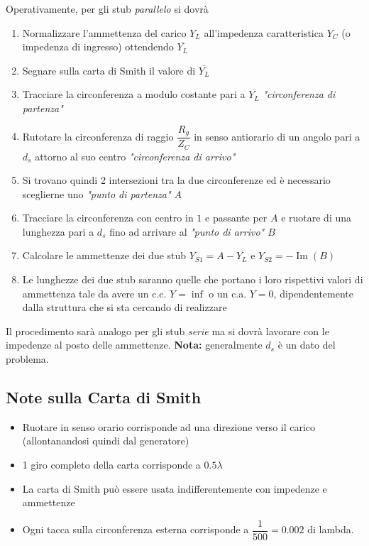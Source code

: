 \documentclass{article}
\begin{document}
Operativamente, per gli stub \textit{parallelo} si dovrà
\begin{enumerate}
	\item Normalizzare l'ammettenza del carico \(Y_L\) all'impedenza caratteristica \(Y_C\) (o impedenza di ingresso) ottendendo \(\overline{Y_L}\)
	\item Segnare sulla carta di Smith il valore di \(\overline{Y_L}\)
	\item Tracciare la circonferenza a modulo costante pari a \(\overline{Y_L}\) \textit{"circonferenza di partenza"}
	\item Rutotare la circonferenza di raggio \(\dfrac{R_g}{Z_C}\) in senso antiorario di un angolo pari a \(d_s\) attorno al suo centro \textit{"circonferenza di arrivo"}
	\item Si trovano quindi 2 intersezioni tra la due circonferenze ed è necessario sceglierne uno \textit{"punto di partenza" \(A\)}
	\item Tracciare la circonferenza con centro in \(1\) e passante per \(A\) e ruotare di una lunghezza pari a \(d_s\) fino ad arrivare al \textit{"punto di arrivo" \(B\)}
	\item Calcolare le ammettenze dei due stub \(Y_{S1} = A - \overline{Y_L}\) e \(Y_{S2} = -\operatorname{Im}(B) \)
	\item Le lunghezze dei due stub saranno quelle che portano i loro rispettivi valori di ammettenza tale da avere un c.c. \( Y = \inf \) o un c.a. \( Y = 0 \), dipendentemente dalla struttura che si sta cercando di realizzare
\end{enumerate}
Il procedimento sarà analogo per gli stub \textit{serie} ma si dovrà lavorare con le impedenze al posto delle ammettenze.
\textbf{Nota:} generalmente \(d_s\) è un dato del problema.

\subsection{Note sulla Carta di Smith}
\begin{itemize}
	\item Ruotare in senso orario corrisponde ad una direzione verso il carico (allontanandosi quindi dal generatore)
	\item 1 giro completo della carta corrisponde a \(0.5 \lambda\)
	\item La carta di Smith può essere usata indifferentemente con impedenze e ammettenze
	\item Ogni tacca sulla circonferenza esterna corrisponde a \( \dfrac{1}{500} = 0.002 \) di lambda.
\end{itemize}
\end{document}
